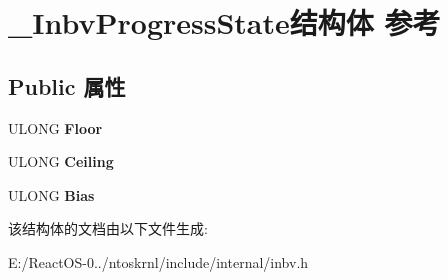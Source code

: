 \hypertarget{struct___inbv_progress_state}{}\section{\+\_\+\+Inbv\+Progress\+State结构体 参考}
\label{struct___inbv_progress_state}
\subsection*{Public 属性}
\begin{DoxyCompactItemize}
\item 
\mbox{\label{struct___inbv_progress_state_aa3336723897067874876e843b1645f4a}} 
U\+L\+O\+NG {\bfseries Floor}
\item 
\mbox{\label{struct___inbv_progress_state_ae774143702f29dabff049711c4bff6c0}} 
U\+L\+O\+NG {\bfseries Ceiling}
\item 
\mbox{\label{struct___inbv_progress_state_af532b32fdb7604612404ce2cb1aa788b}} 
U\+L\+O\+NG {\bfseries Bias}
\end{DoxyCompactItemize}


该结构体的文档由以下文件生成\+:\begin{DoxyCompactItemize}
\item 
E\+:/\+React\+O\+S-\/0../ntoskrnl/include/internal/inbv.\+h\end{DoxyCompactItemize}
